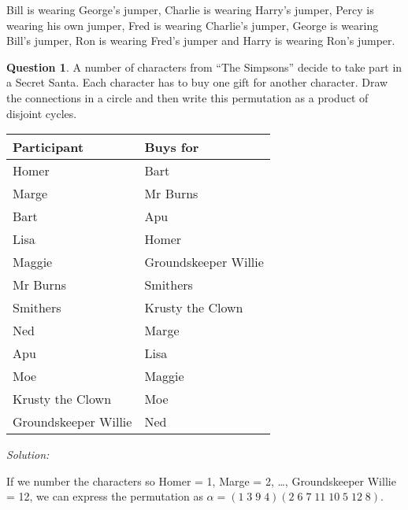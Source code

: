 \documentclass[a4paper,12pt]{article}
\theoremstyle{definition}
\newtheorem{question}{Question}%
\theoremstyle{remark}
\begin{document}
Bill is wearing George's jumper, Charlie is wearing Harry's jumper, Percy is wearing his own jumper, Fred is wearing Charlie's jumper, George is wearing Bill's jumper, Ron is wearing Fred's jumper and Harry is wearing Ron's jumper.

\clearpage


\begin{question}

A number of characters from ``The Simpsons'' decide to take part in a Secret Santa. Each character has to buy one gift for another character. Draw the connections in a circle and then write this permutation as a product of disjoint cycles. 
  \begin{table}[h]
\small
    \centering
    \begin{tabular}{|l |l|} \hline
      Participant & Buys for \\ \hline
      Homer &   Bart \\
      Marge & Mr Burns\\
      Bart & Apu\\
      Lisa & Homer\\
      Maggie & Groundskeeper Willie\\
      Mr Burns & Smithers\\
      Smithers & Krusty the Clown\\
      Ned & Marge\\
      Apu &  Lisa\\
      Moe & Maggie\\
      Krusty the Clown & Moe\\
      Groundskeeper Willie &  Ned\\ \hline
    \end{tabular}
  \end{table}
\end{question}

\textit{Solution:}

If we number the characters so Homer = 1, Marge = 2, \ldots , Groundskeeper Willie = 12, we can express the permutation as $\alpha = (1\;3\;9\;4)(2\; 6\; 7\; 11\; 10\; 5\; 12\; 8).$ 


\end{document}
